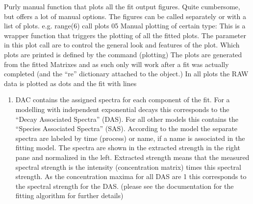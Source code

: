 \documentclass[letterpaper,10pt,english]{sphinxmanual}
\begin{document}
\begin{fulllineitems}
\label{\detokenize{plot_func:plot_func.plot_fit_output}}
Purly manual function that plots all the fit output figures. Quite cumbersome,
but offers a lot of manual options. The figures can be called separately
or with a list of plots. e.g. range(6) call plots 0\sphinxhyphen{}5 Manual plotting of certain type:
This is a wrapper function that triggers the plotting of all the fitted plots.
The parameter in this plot call are to control the general look and features of the plot.
Which plots are printed is defined by the command (plotting)
The plots are generated from the fitted Matrixes and as such only will work after a fit was actually
completed (and the “re” dictionary attached to the object.)
In all plots the RAW data is plotted as dots and the fit with lines

\begin{enumerate}
%
\setcounter{enumi}{-1}
\item {} 
DAC contains the assigned spectra for each component of the fit. For
a modelling with independent exponential decays this corresponds to
the “Decay Associated Spectra” (DAS). For all other models this
contains the “Species Associated Spectra” (SAS). According to the
model the separate spectra are labeled by time (process) or name, if
a name is associated in the fitting model. The spectra are shown in
the extracted strength in the right pane and normalized in the left.
Extracted strength means that the measured spectral strength is the
intensity (concentration matrix) times this spectral strength. As the
concentration maxima for all DAS are 1 this corresponds to the
spectral strength for the DAS. (please see the documentation for the
fitting algorithm for further details)


\end{enumerate}
\end{fulllineitems}
\end{document}

